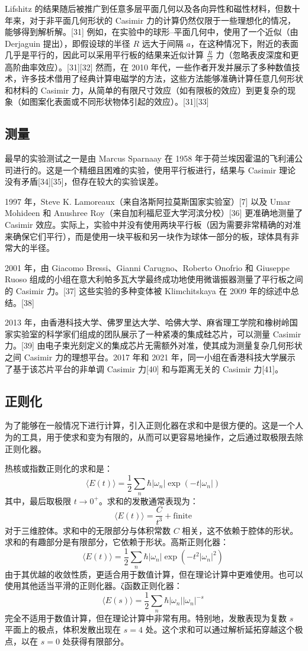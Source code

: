 Lifshitz 的结果随后被推广到任意多层平面几何以及各向异性和磁性材料，但数十年来，对于非平面几何形状的 Casimir 力的计算仍然仅限于一些理想化的情况，能够得到解析解。[31] 例如，在实验中的球形–平面几何中，使用了一个近似（由 Derjaguin 提出），即假设球的半径 \(R\) 远大于间隔 \(a\)，在这种情况下，附近的表面几乎是平行的，因此可以采用平行板的结果来近似计算 \(\frac{R}{a^3}\) 力（忽略表皮深度和更高阶曲率效应）。[31][32] 然而，在 2010 年代，一些作者开发并展示了多种数值技术，许多技术借用了经典计算电磁学的方法，这些方法能够准确计算任意几何形状和材料的 Casimir 力，从简单的有限尺寸效应（如有限板的效应）到更复杂的现象（如图案化表面或不同形状物体引起的效应）。[31][33]
\subsection{测量} 
最早的实验测试之一是由 Marcus Sparnaay 在 1958 年于荷兰埃因霍温的飞利浦公司进行的。这是一个精细且困难的实验，使用平行板进行，结果与 Casimir 理论没有矛盾[34][35]，但存在较大的实验误差。

1997 年，Steve K. Lamoreaux（来自洛斯阿拉莫斯国家实验室）[7] 以及 Umar Mohideen 和 Anushree Roy（来自加利福尼亚大学河滨分校）[36] 更准确地测量了 Casimir 效应。实际上，实验中并没有使用两块平行板（因为需要非常精确的对准来确保它们平行），而是使用一块平板和另一块作为球体一部分的板，球体具有非常大的半径。

2001 年，由 Giacomo Bressi、Gianni Carugno、Roberto Onofrio 和 Giuseppe Ruoso 组成的小组在意大利帕多瓦大学最终成功地使用微谐振器测量了平行板之间的 Casimir 力。[37] 这些实验的多种变体被 Klimchitskaya 在 2009 年的综述中总结。[38]

2013 年，由香港科技大学、佛罗里达大学、哈佛大学、麻省理工学院和橡树岭国家实验室的科学家们组成的团队展示了一种紧凑的集成硅芯片，可以测量 Casimir 力。[39] 由电子束光刻定义的集成芯片无需额外对准，使其成为测量复杂几何形状之间 Casimir 力的理想平台。2017 年和 2021 年，同一小组在香港科技大学展示了基于该芯片平台的非单调 Casimir 力[40] 和与距离无关的 Casimir 力[41]。
\subsection{正则化}
为了能够在一般情况下进行计算，引入正则化器在求和中是很方便的。这是一个人为的工具，用于使求和变为有限的，从而可以更容易地操作，之后通过取极限去除正则化器。

热核或指数正则化的求和是：
\[
\langle E(t) \rangle = \frac{1}{2} \sum_{n} \hbar |\omega_n| \exp(-t |\omega_n|)~
\]
其中，最后取极限 \( t \to 0^+ \)。求和的发散通常表现为：
\[
\langle E(t) \rangle = \frac{C}{t^3} + \text{finite}~
\]
对于三维腔体。求和中的无限部分与体积常数 \( C \) 相关，这不依赖于腔体的形状。求和的有趣部分是有限部分，它依赖于形状。高斯正则化器：
\[
\langle E(t) \rangle = \frac{1}{2} \sum_{n} \hbar |\omega_n| \exp\left(-t^2 |\omega_n|^2 \right)~
\]
由于其优越的收敛性质，更适合用于数值计算，但在理论计算中更难使用。也可以使用其他适当平滑的正则化器。ζ函数正则化器：
\[
\langle E(s) \rangle = \frac{1}{2} \sum_{n} \hbar |\omega_n| |\omega_n|^{-s}~
\]
完全不适用于数值计算，但在理论计算中非常有用。特别地，发散表现为复数 \( s \) 平面上的极点，体积发散出现在 \( s = 4 \) 处。这个求和可以通过解析延拓穿越这个极点，以在 \( s = 0 \) 处获得有限部分。

